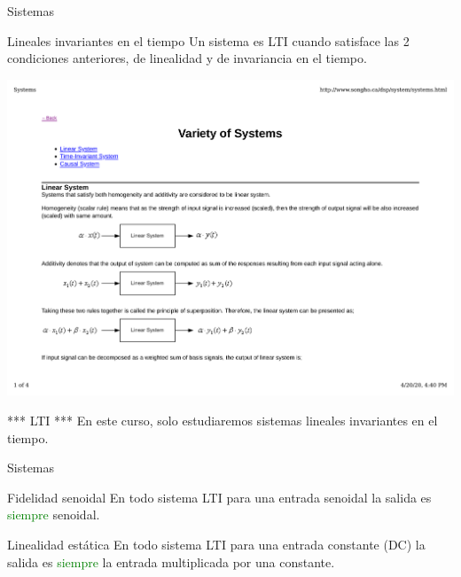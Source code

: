  \begin{frame}{Sistemas}{}
    \begin{block}{Lineales invariantes en el tiempo}
       Un sistema es LTI cuando satisface las 2 condiciones anteriores, de linealidad y de invariancia en el tiempo.
    \end{block}
    \center\includegraphics[width=1\textwidth]{1_clase/lti}
    \vfill
    \begin{alertblock}{*** LTI ***}
       En este curso, \alert{solo} estudiaremos sistemas lineales invariantes en el tiempo.
    \end{alertblock}
 \end{frame}
 \begin{frame}{Sistemas}{}
    \begin{block}{Fidelidad senoidal}
       En todo sistema LTI para una entrada senoidal la salida es \textcolor{green}{siempre} senoidal.
    \end{block}
    \begin{block}{Linealidad estática}
       En todo sistema LTI para una entrada constante (DC) la salida es \textcolor{green}{siempre} la entrada multiplicada por una constante.
    \end{block}
    \vfill
 \end{frame}
